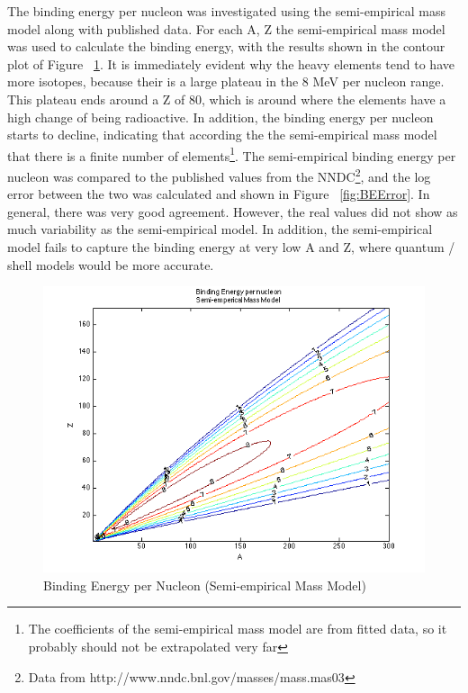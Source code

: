 \documentclass[11pt]{article}
\begin{document}
The binding energy per nucleon was investigated using the semi-empirical mass model along with published data.
For each A, Z the semi-empirical mass model was used to calculate the binding energy, with the results shown in the contour plot of Figure ~\ref{fig:BESemiEmperical}.
It is immediately evident why the heavy elements tend to have more isotopes, because their is a large plateau in the 8 MeV per nucleon range.
This plateau ends around a Z of 80, which is around where the elements have a high change of being radioactive.
In addition, the binding energy per nucleon starts to decline, indicating that according the the semi-empirical mass model that there is a finite number of elements\footnote{The coefficients of the semi-empirical mass model are from fitted data, so it probably should not be extrapolated very far}.
The semi-empirical binding energy per nucleon was compared to the published values from the NNDC\footnote{Data from http://www.nndc.bnl.gov/masses/mass.mas03}, and the log error between the two was calculated and shown in Figure ~\ref{fig:BEError}.
In general, there was very good agreement.  However, the real values did not show as much variability as the semi-empirical model. In addition, the semi-empirical model fails to capture the binding energy at very low A and Z, where quantum / shell models would be more accurate.
\begin{figure}[hb]
	\centering
	\includegraphics[width=\textwidth]{BEPerNuc_SemiEmp.png}
	\caption{Binding Energy per Nucleon (Semi-empirical Mass Model)}
	\label{fig:BESemiEmperical}
\end{figure}
\end{document}
